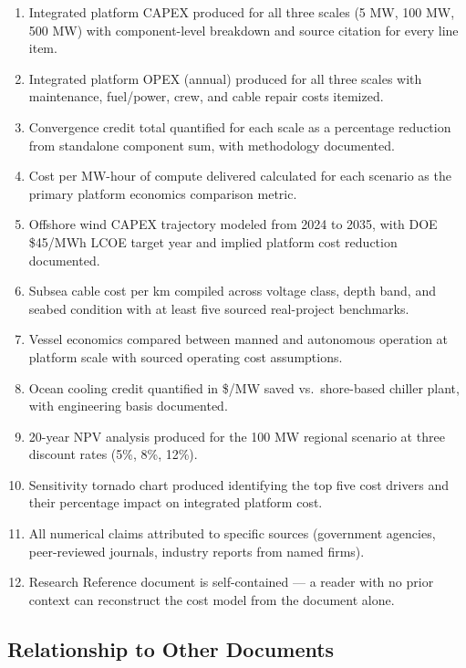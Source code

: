 \documentclass[11pt,letterpaper]{article}
\begin{document}
\begin{enumerate}
  \item Integrated platform CAPEX produced for all three scales (5 MW, 100 MW, 500 MW)
    with component-level breakdown and source citation for every line item.
  \item Integrated platform OPEX (annual) produced for all three scales with
    maintenance, fuel/power, crew, and cable repair costs itemized.
  \item Convergence credit total quantified for each scale as a percentage reduction
    from standalone component sum, with methodology documented.
  \item Cost per MW-hour of compute delivered calculated for each scenario as the
    primary platform economics comparison metric.
  \item Offshore wind CAPEX trajectory modeled from 2024 to 2035, with DOE \$45/MWh
    LCOE target year and implied platform cost reduction documented.
  \item Subsea cable cost per km compiled across voltage class, depth band, and
    seabed condition with at least five sourced real-project benchmarks.
  \item Vessel economics compared between manned and autonomous operation at
    platform scale with sourced operating cost assumptions.
  \item Ocean cooling credit quantified in \$/MW saved vs.\ shore-based chiller plant,
    with engineering basis documented.
  \item 20-year NPV analysis produced for the 100 MW regional scenario at three
    discount rates (5\%, 8\%, 12\%).
  \item Sensitivity tornado chart produced identifying the top five cost drivers
    and their percentage impact on integrated platform cost.
  \item All numerical claims attributed to specific sources (government agencies,
    peer-reviewed journals, industry reports from named firms).
  \item Research Reference document is self-contained --- a reader with no prior
    context can reconstruct the cost model from the document alone.
\end{enumerate}

\subsection{Relationship to Other Documents}
\end{document}
